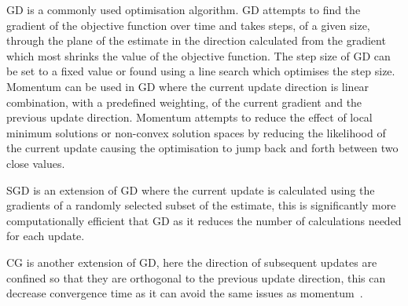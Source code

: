             \gls{GD} is a commonly used optimisation algorithm. \gls{GD} attempts to find the gradient of the objective function over time and takes steps, of a given size, through the plane of the estimate in the direction calculated from the gradient which most shrinks the value of the objective function. The step size of \gls{GD} can be set to a fixed value or found using a line search which optimises the step size. Momentum can be used in \gls{GD} where the current update direction is linear combination, with a predefined weighting, of the current gradient and the previous update direction. Momentum attempts to reduce the effect of local minimum solutions or non-convex solution spaces by reducing the likelihood of the current update causing the optimisation to jump back and forth between two close values. 
            
            \gls{SGD} is an extension of \gls{GD} where the current update is calculated using the gradients of a randomly selected subset of the estimate, this is significantly more computationally efficient that \gls{GD} as it reduces the number of calculations needed for each update.
            
            \gls{CG} is another extension of \gls{GD}, here the direction of subsequent updates are confined so that they are orthogonal to the previous update direction, this can decrease convergence time as it can avoid the same issues as momentum~.
            
        
        
